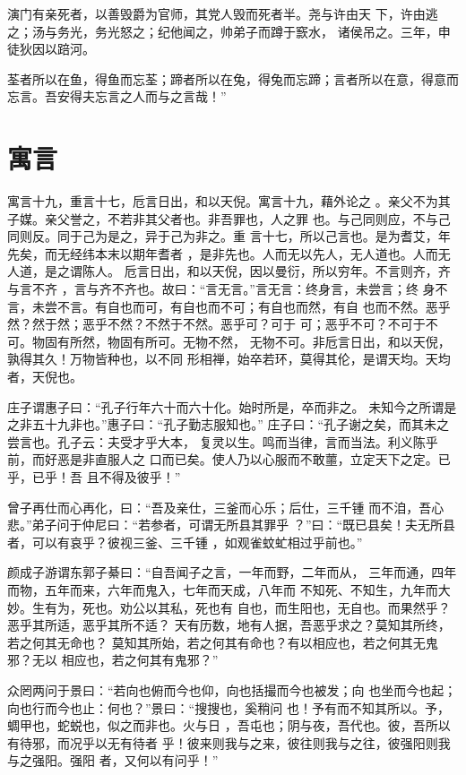 \documentclass[12pt,UTF8]{ctexbook}
\begin{document}
演门有亲死者，以善毁爵为官师，其党人毁而死者半。尧与许由天 下，许由逃之；汤与务光，务光怒之；纪他闻之，帅弟子而蹲于窾水， 诸侯吊之。三年，申徒狄因以踣河。

荃者所以在鱼，得鱼而忘荃；蹄者所以在兔，得兔而忘蹄；言者所以在意，得意而忘言。吾安得夫忘言之人而与之言哉！”
\section{寓言}

寓言十九，重言十七，卮言日出，和以天倪。寓言十九，藉外论之 。亲父不为其子媒。亲父誉之，不若非其父者也。非吾罪也，人之罪 也。与己同则应，不与己同则反。同于己为是之，异于己为非之。重 言十七，所以己言也。是为耆艾，年先矣，而无经纬本末以期年耆者 ，是非先也。人而无以先人，无人道也。人而无人道，是之谓陈人。 卮言日出，和以天倪，因以曼衍，所以穷年。不言则齐，齐与言不齐 ，言与齐不齐也。故曰：“言无言。”言无言：终身言，未尝言；终 身不言，未尝不言。有自也而可，有自也而不可；有自也而然，有自 也而不然。恶乎然？然于然；恶乎不然？不然于不然。恶乎可？可于 可；恶乎不可？不可于不可。物固有所然，物固有所可。无物不然， 无物不可。非卮言日出，和以天倪，孰得其久！万物皆种也，以不同 形相禅，始卒若环，莫得其伦，是谓天均。天均者，天倪也。

庄子谓惠子曰：“孔子行年六十而六十化。始时所是，卒而非之。 未知今之所谓是之非五十九非也。”惠子曰：“孔子勤志服知也。” 庄子曰：“孔子谢之矣，而其未之尝言也。孔子云：夫受才乎大本， 复灵以生。鸣而当律，言而当法。利义陈乎前，而好恶是非直服人之 口而已矣。使人乃以心服而不敢蘁，立定天下之定。已乎，已乎！吾 且不得及彼乎！”

曾子再仕而心再化，曰：“吾及亲仕，三釜而心乐；后仕，三千锺 而不洎，吾心悲。”弟子问于仲尼曰：“若参者，可谓无所县其罪乎 ？”曰：“既已县矣！夫无所县者，可以有哀乎？彼视三釜、三千锺 ，如观雀蚊虻相过乎前也。”

颜成子游谓东郭子綦曰：“自吾闻子之言，一年而野，二年而从， 三年而通，四年而物，五年而来，六年而鬼入，七年而天成，八年而 不知死、不知生，九年而大妙。生有为，死也。劝公以其私，死也有 自也，而生阳也，无自也。而果然乎？恶乎其所适，恶乎其所不适？ 天有历数，地有人据，吾恶乎求之？莫知其所终，若之何其无命也？ 莫知其所始，若之何其有命也？有以相应也，若之何其无鬼邪？无以 相应也，若之何其有鬼邪？”

众罔两问于景曰：“若向也俯而今也仰，向也括撮而今也被发；向 也坐而今也起；向也行而今也止：何也？”景曰：“搜搜也，奚稍问 也！予有而不知其所以。予，蜩甲也，蛇蜕也，似之而非也。火与日 ，吾屯也；阴与夜，吾代也。彼，吾所以有待邪，而况乎以无有待者 乎！彼来则我与之来，彼往则我与之往，彼强阳则我与之强阳。强阳 者，又何以有问乎！”
\end{document}
